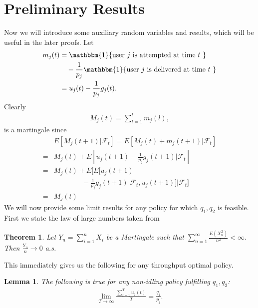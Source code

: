 \documentclass[letterpaper, 10 pt, conference]{ieeeconf}
\newtheorem{lemma}{Lemma}
\newtheorem{theorem}{Theorem}
\begin{document}
\section{Preliminary Results}\label{sec3}
Now we will introduce some auxiliary random variables and results, which will be useful in the later proofs. 
Let 
\begin{align}\label{def:martin}
m_{j}(t) &= \mathbbm{1} \{\mbox{user $j$ is attempted at time $t$  }\} \notag\\
& \quad- \frac{1}{p_{j}} \mathbbm{1} \{\mbox{user $j$ is delivered at time $t$  }\} \notag \\
&=u_{j}(t)  - \frac{1}{p_{j}} g_{j}(t) .
\end{align}
Clearly 
\begin{align}\label{def:martin2}
M_{j}(t) = \sum_{l=1}^{t} m_{j}(l),
\end{align}
is a martingale since
\begin{align*}
& E[M_{j}(t+1)| \mathcal{F}_{t} ] = E[M_{j}(t) + m_{j}(t+1) | \mathcal{F}_{t}]\\
=& M_{j}(t) + E\left[u_{j}(t+1)  - \frac{1}{p_{j}} g_{j}(t+1)| \mathcal{F}_{t}  \right]\\
=& M_{j}(t)+ E\bigg[ E\Big[u_{j}(t+1)  \\ 
&\qquad\qquad- \frac{1}{p_{j}} g_{j}(t+1)\Big| \mathcal{F}_{t},u_{j}(t+1)\Big]\bigg | \mathcal{F}_{t}  \bigg]\\
=& M_{j}(t) 
\end{align*}
We will now provide some limit results for any policy for which $q_{1},q_{2}$ is feasible. First we state the law of large numbers taken from~\cite{c6}\\
\begin{theorem}\label{llnmartingale}
Let $Y_{n} = \sum_{i=1}^{n} X_{i}$ be a Martingale such that $\sum_{n=1}^{\infty} \frac{E(X^{2}_{n})}{n^{2}} <\infty$. Then $\frac{Y_{n}}{n}\to 0$ a.s.
\end{theorem}
This immediately gives us the following for any throughput optimal policy.
\begin{lemma}\label{lemma2.5}
The following is true for any non-idling policy fulfilling $q_{1}, q_{2}$:
\begin{align*}
\lim_{T\to\infty} \frac{\sum_{t=1}^{T} u_{j}(t)  }{T}=\frac{q_{j}}{p_{j}}.
\end{align*}
\end{lemma}
\end{document}
